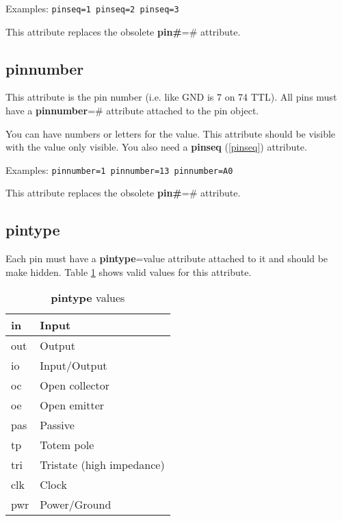 \documentclass{article}
\begin{document}
Examples: \texttt{pinseq=1 pinseq=2 pinseq=3}

This attribute replaces the obsolete {\bf pin\#}=\# attribute.


\subsection{\bf pinnumber\label{pinnumber}}
This attribute is the pin number (i.e. like GND is 7 on 74 TTL).  
All pins must have a {\bf pinnumber}=\# attribute attached to the pin object.

You can have numbers or letters for the value.  This attribute should
be visible with the value only visible.  You also need a {\bf pinseq}
(\ref{pinseq}) attribute.

Examples: \texttt{pinnumber=1 pinnumber=13 pinnumber=A0}   

This attribute replaces the obsolete {\bf pin\#}=\# attribute.


\subsection{\bf pintype\label{pintype}}
Each pin must have a {\bf pintype}=value attribute attached to it and 
should be make hidden. Table \ref{pintype values} shows valid values for
this attribute.  

\vspace{.125in}

\begin{table}[h]
\begin{center}
\begin{tabular}{|l|l|} \hline
in & Input \\ \hline
out & Output \\ \hline
io & Input/Output \\ \hline
oc & Open collector \\ \hline
oe & Open emitter \\ \hline
pas & Passive \\ \hline
tp & Totem pole \\ \hline
tri & Tristate (high impedance) \\ \hline
clk & Clock \\ \hline
pwr & Power/Ground \\ \hline
\end{tabular}
\end{center}
\caption{{\bf pintype} values} \label{pintype values}
\end{table}
\end{document}
